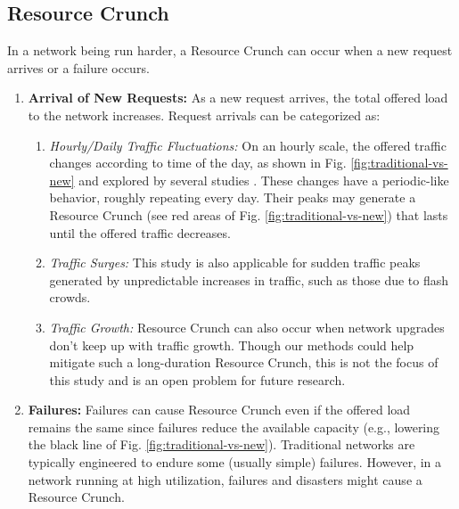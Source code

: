 \documentclass[journal]{IEEEtran}
\begin{document}
\subsection{Resource Crunch}
In a network being run harder, a Resource Crunch can occur when a new request arrives or a failure occurs.

\begin{enumerate}
\item \textbf{Arrival of New Requests:} As a new request arrives, the total offered load to the network increases. Request arrivals can be categorized as:
\begin{enumerate}[label=\textit{\alph*.}]
\item\textit{Hourly/Daily Traffic Fluctuations:} On an hourly scale, the offered traffic changes according to time of the day, as shown in Fig. \ref{fig:traditional-vs-new} and explored by several studies \cite{ager2012anatomy, labovitz2010internet}. These changes have a periodic-like behavior, roughly repeating every day. Their peaks may generate a Resource Crunch (see red areas of Fig. \ref{fig:traditional-vs-new}) that lasts until the offered traffic decreases.

\item\textit{Traffic Surges:} This study is also applicable for sudden traffic peaks generated by unpredictable increases in traffic, such as those due to flash crowds.

\item\textit{Traffic Growth:} Resource Crunch can also occur when network upgrades don't keep up with traffic growth. Though our methods could help mitigate such a long-duration Resource Crunch, this is not the focus of this study and is an open problem for future research. 
\end{enumerate}
\item \textbf{Failures:} Failures can cause Resource Crunch even if the offered load remains the same since failures reduce the available capacity (e.g., lowering the black line of Fig. \ref{fig:traditional-vs-new}). Traditional networks are typically engineered to endure some (usually simple) failures. However, in a network running at high utilization, failures and disasters might cause a Resource Crunch. %
\end{enumerate}
\end{document}
